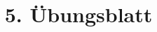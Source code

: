 


\title{5. Übungsblatt}



\maketitle
\thispagestyle{empty}
\newpage

\printbibliography




%



